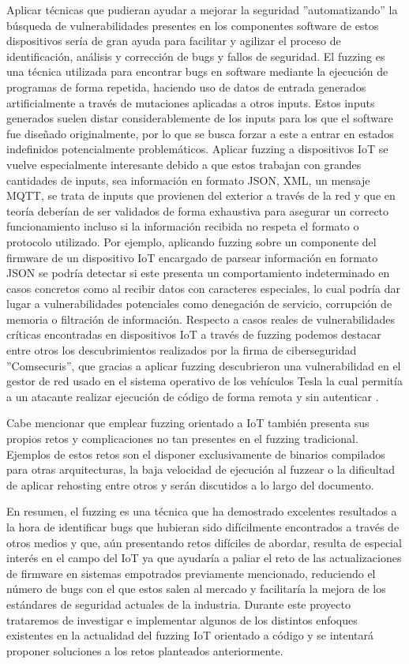 Aplicar técnicas que pudieran ayudar a mejorar la seguridad ''automatizando'' la búsqueda de vulnerabilidades presentes en los componentes software 
de estos dispositivos sería de gran ayuda para facilitar y agilizar el proceso de identificación, análisis y corrección 
de bugs y fallos de seguridad. El fuzzing es una técnica utilizada para encontrar bugs en software mediante la ejecución de 
programas de forma repetida, haciendo uso de datos de entrada generados artificialmente a través de mutaciones aplicadas a otros
inputs. Estos inputs generados suelen distar considerablemente de los inputs para los que el software fue diseñado 
originalmente, por lo que se busca forzar a este a entrar en estados indefinidos potencialmente problemáticos. Aplicar
fuzzing a dispositivos IoT se vuelve especialmente interesante debido a que estos trabajan con grandes cantidades de inputs,
sea información en formato JSON, XML, un mensaje MQTT, se trata de inputs que provienen del exterior a través de la red y que en teoría deberían de ser validados 
de forma exhaustiva para asegurar un correcto funcionamiento incluso si la información recibida no respeta el formato o protocolo 
utilizado. Por ejemplo, aplicando fuzzing sobre un componente del firmware de un dispositivo IoT encargado de parsear información en formato JSON
se podría detectar si este presenta un comportamiento indeterminado en casos concretos como al recibir datos con caracteres especiales, lo cual
podría dar lugar a vulnerabilidades potenciales como denegación de servicio, corrupción de memoria o filtración de información. Respecto a casos reales
de vulnerabilidades críticas encontradas en dispositivos IoT a través de fuzzing podemos destacar entre otros los descubrimientos realizados por la firma 
de ciberseguridad ''Comsecuris'', que gracias a aplicar fuzzing descubrieron una vulnerabilidad en el gestor de red usado en el 
sistema operativo de los vehículos Tesla la cual permitía a un atacante realizar ejecución de código de forma remota y sin autenticar \cite{TeslaMCU}.

Cabe mencionar que emplear fuzzing orientado a IoT también presenta sus propios retos y complicaciones no tan presentes en el fuzzing tradicional. 
Ejemplos de estos retos son el disponer exclusivamente de binarios compilados para otras arquitecturas, la baja velocidad de ejecución al fuzzear o la 
dificultad de aplicar rehosting entre otros y serán discutidos a lo largo del documento.\bigskip

En resumen, el fuzzing es una técnica que ha demostrado excelentes resultados a la hora de identificar bugs 
que hubieran sido difícilmente encontrados a través de otros medios y que, aún presentando retos difíciles de abordar, resulta de especial interés en
el campo del IoT ya que ayudaría a paliar el reto de las actualizaciones de firmware en sistemas empotrados previamente mencionado, reduciendo el número de bugs con el que 
estos salen al mercado y facilitaría la mejora de los estándares de seguridad actuales de la industria. Durante este proyecto trataremos de investigar
e implementar algunos de los distintos enfoques existentes en la actualidad del fuzzing IoT orientado a código y se intentará proponer 
soluciones a los retos planteados anteriormente.

